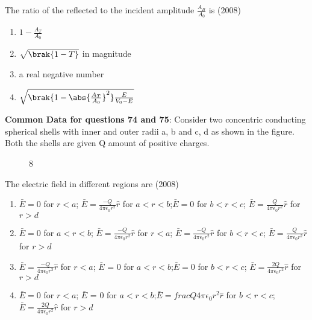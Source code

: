     \item The ratio of the reflected to the incident amplitude $\frac{A_B}{A_0}$ is \hfill (2008)
      \begin{enumerate}[label = (\Alph*)]
        \item $1-\frac{A_T}{A_0}$
        \item $\sqrt{\brak{1-T}}$ in magnitude
        \item a real negative number
        \item $\sqrt{\brak{1-\abs{\frac{A_T}{A_0}}^2}\frac{E}{V_0 - E}}$
      \end{enumerate}
    \textbf{Common Data for questions 74 and 75}: Consider two concentric conducting spherical shells with inner and outer radii a, b and c, d as shown in the figure. Both the shells are given Q amount of positive charges.
    \begin{figure}[!ht]
      \centering
      \caption{ 8}
      \label{fig 8}
  \end{figure}
    \item The electric field in different regions are \hfill (2008)
      \begin{enumerate}[label=(\Alph*)]
        \item $\bar{E} = 0$ for $r < a$; $\bar{E} = \frac{-Q}{4\pi\epsilon_0r^2}\hat{r}$ for $a<r<b$;$\bar{E} = 0$ for $b< r < c$; $\bar{E} = \frac{Q}{4\pi\epsilon_0r^2}\hat{r}$ for $r>d$
        \item $\bar{E} = 0$ for $a < r < b$; $\bar{E} = \frac{-Q}{4\pi\epsilon_0r^2}\hat{r}$ for $r<a$; $\bar{E} = \frac{-Q}{4\pi\epsilon_0r^2}\hat{r}$ for $b< r < c$; $\bar{E} = \frac{Q}{4\pi\epsilon_0r^2}\hat{r}$ for $r>d$ 
        \item $\bar{E} = \frac{-Q}{4\pi\epsilon_0r^2}\hat{r}$ for $r < a$; $\bar{E}$ = 0 for $a<r<b$;$\bar{E} = 0$ for $b< r < c$; $\bar{E} = \frac{2Q}{4\pi\epsilon_0r^2}\hat{r}$ for $r>d$ 
        \item $\bar{E} = 0$ for $r < a$; $\bar{E}$ = 0 for $a<r<b$;$\bar{E} = frac{Q}{4\pi\epsilon_0r^2}\hat{r}$ for $b< r < c$; $\bar{E} = \frac{2Q}{4\pi\epsilon_0r^2}\hat{r}$ for $r>d $ 
      \end{enumerate}
